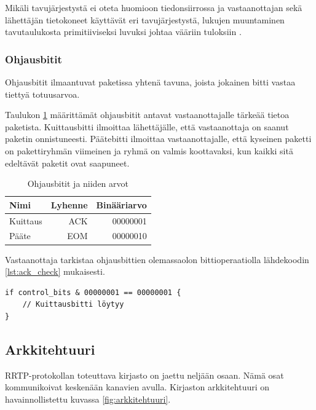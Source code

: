 \documentclass[a4paper,12pt]{article}
\begin{document}
    Mikäli tavujärjestystä ei oteta huomioon tiedonsiirrossa ja vastaanottajan sekä lähettäjän tietokoneet käyttävät eri tavujärjestystä, lukujen muuntaminen tavutaulukosta primitiiviseksi luvuksi johtaa vääriin tuloksiin     \cite{Adiga2007HowC}.

    \subsubsection*{Ohjausbitit}\label{subsec:control_bits}
    Ohjausbitit ilmaantuvat paketissa yhtenä tavuna, joista jokainen bitti vastaa tiettyä totuusarvoa.

    Taulukon \ref{tab:control_bits} määrittämät ohjausbitit antavat vastaanottajalle tärkeää tietoa paketista. Kuittausbitti ilmoittaa lähettäjälle, että vastaanottaja on saanut paketin onnistuneesti. Päätebitti ilmoittaa vastaanottajalle, että kyseinen paketti on pakettiryhmän viimeinen ja ryhmä on valmis koottavaksi, kun kaikki sitä edeltävät paketit ovat saapuneet. \par
    
    \begin{table}[h!]
        \centering
        \caption{Ohjausbitit ja niiden arvot}
        \label{tab:control_bits}
        \begin{tabularx}{\textwidth}{|X|r|r|}
        \hline
            \textbf{Nimi}     & \textbf{Lyhenne} & \textbf{Binääriarvo} \\         \hline
            Kuittaus & ACK     & 00000001    \\ \hline
            Pääte    & EOM     & 00000010    \\ \hline
        \end{tabularx}
    \end{table}


    Vastaanottaja tarkistaa ohjausbittien olemassaolon bittioperaatiolla lähdekoodin \ref{lst:ack_check} mukaisesti.
    
    \begin{lstlisting}[float, caption={Kuittausbitin tarkistus ohjausbiteistä}, label={lst:ack_check}]
if control_bits & 00000001 == 00000001 {
    // Kuittausbitti löytyy
}\end{lstlisting}

    \subsection{Arkkitehtuuri}\label{sec:arkkitehtuuri}
    RRTP-protokollan toteuttava kirjasto on jaettu neljään osaan. Nämä osat kommunikoivat keskenään kanavien avulla. Kirjaston arkkitehtuuri on havainnollistettu kuvassa \ref{fig:arkkitehtuuri}. 
\end{document}
